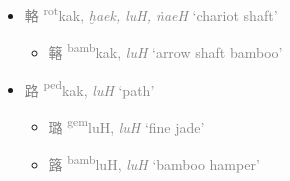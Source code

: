 \begin{itemize}
 

    \item \textcolor{gray}{{\Large{輅}} %
    {\large{{\textsuperscript{rot}}kak}},
    \textit{ḫaek, luH, ṅaeH} `chariot shaft'} %
\begin{itemize}
\vspace{-1mm}
    \item \textcolor{gray}{{\Large{簵}} %
    {\large{{\textsuperscript{bamb}}kak}},
    \textit{luH} `arrow shaft bamboo'} %

\end{itemize}





 \item \textcolor{gray}{{\Large{路}} %
    {\large{{\textsuperscript{ped}}kak}},
    \textit{luH} `path'} %


\begin{itemize}
\vspace{-2mm}

    \item \textcolor{gray}{{\Large{璐}} %
    {\large{{\textsuperscript{gem}}luH}},
    \textit{luH} `fine jade'} %

    \item \textcolor{gray}{{\Large{簬}} %
    {\large{{\textsuperscript{bamb}}luH}},
    \textit{luH} `bamboo hamper'} %

    



\end{itemize}


\end{itemize}

